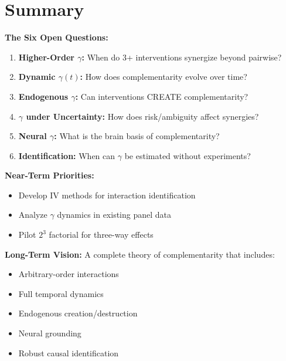 \section{Summary}
\label{sec:summary}

\begin{tcolorbox}[colback=gray!5!white,colframe=gray!75!black,title=\textbf{Summary: The Complementarity Research Frontier}]

\textbf{The Six Open Questions:}
\begin{enumerate}[noitemsep]
    \item \textbf{Higher-Order $\gamma$:} When do 3+ interventions synergize beyond pairwise?
    \item \textbf{Dynamic $\gamma(t)$:} How does complementarity evolve over time?
    \item \textbf{Endogenous $\gamma$:} Can interventions CREATE complementarity?
    \item \textbf{$\gamma$ under Uncertainty:} How does risk/ambiguity affect synergies?
    \item \textbf{Neural $\gamma$:} What is the brain basis of complementarity?
    \item \textbf{Identification:} When can $\gamma$ be estimated without experiments?
\end{enumerate}

\textbf{Near-Term Priorities:}
\begin{itemize}[noitemsep]
    \item Develop IV methods for interaction identification
    \item Analyze $\gamma$ dynamics in existing panel data
    \item Pilot $2^3$ factorial for three-way effects
\end{itemize}

\textbf{Long-Term Vision:}
A complete theory of complementarity that includes:
\begin{itemize}[noitemsep]
    \item Arbitrary-order interactions
    \item Full temporal dynamics
    \item Endogenous creation/destruction
    \item Neural grounding
    \item Robust causal identification
\end{itemize}

\end{tcolorbox}

